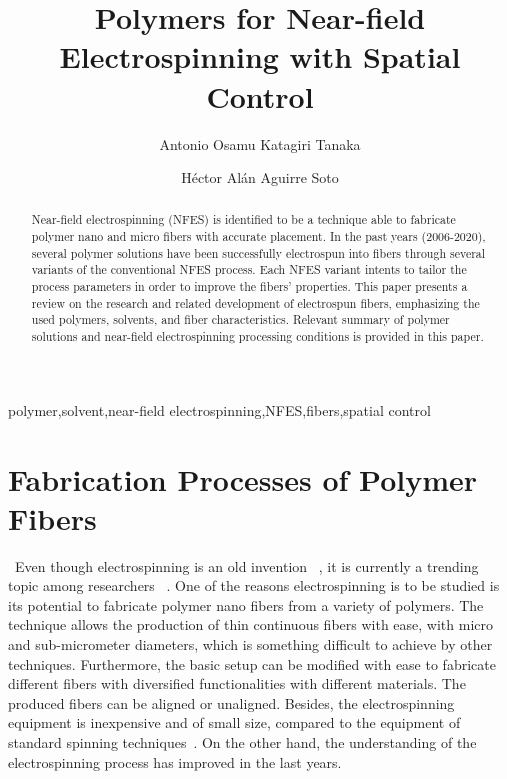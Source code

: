 \documentclass[5p,,preprint,12pt,twocolumn]{elsarticle}
\begin{document}


\begin{frontmatter}
	
\title{Polymers for Near-field Electrospinning with Spatial Control
}
    
\author[]{Antonio Osamu Katagiri Tanaka}
\author[]{H{\'e}ctor Al\'{a}n Aguirre Soto}
    

\begin{abstract}
Near-field electrospinning (NFES) is identified to be a technique able to fabricate polymer nano and micro fibers with accurate placement. In the past years (2006-2020), several polymer solutions have been successfully electrospun into fibers through several variants of the conventional NFES process. Each NFES variant intents to tailor the process parameters in order to improve the fibers' properties. This paper presents a review on the research and related development of electrospun fibers, emphasizing the used polymers, solvents, and fiber characteristics. Relevant summary of polymer solutions and near-field electrospinning processing conditions is provided in this paper.
\end{abstract}
\begin{keyword} 
polymer\sep solvent\sep near-field electrospinning\sep NFES\sep fibers\sep spatial control
\end{keyword}

\end{frontmatter}
\tableofcontents

    
\section{Fabrication Processes of Polymer Fibers}
~Even though electrospinning is an old invention \unskip~\cite{527120:12073288}, it is currently a trending topic among researchers \unskip~\cite{527120:12073453,527120:12073495,527120:12073496}. One of the reasons electrospinning is to be studied is its potential to fabricate polymer nano fibers from a variety of polymers. The technique allows the production of thin continuous fibers with ease, with micro and sub-micrometer diameters, which is something difficult to achieve by other techniques. Furthermore, the basic setup can be modified with ease to fabricate different fibers with diversified functionalities with different materials. The produced fibers can be aligned or unaligned. Besides, the electrospinning equipment is inexpensive and of small size, compared to the equipment of standard spinning techniques\unskip~\cite{527120:12073538}. On the other hand, the understanding of the electrospinning process has improved in the last years.
\end{document}

